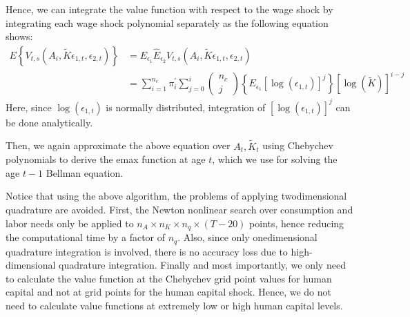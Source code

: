 \documentclass[\econtexRoot/ImaiKeane]{subfiles}
\begin{document}
Hence, we can integrate the value function with respect to the wage shock by integrating each wage shock polynomial separately as the following equation shows:
$$
\begin{aligned}
E\left\{V_{t, s}\left(A_i, \tilde{K} \epsilon_{1, t}, \epsilon_{2, t}\right)\right\} &=E_{\epsilon_1} \hat{E}_{\epsilon_2} V_{t, s}\left(A_i, \tilde{K} \epsilon_{1, t}, \epsilon_{2, t}\right) \\
&=\sum_{i=1}^{n_c} \pi_i^{\prime} \sum_{j=0}^i\left(\begin{array}{c}
n_c \\
j
\end{array}\right)\left\{E_{\epsilon_1}\left[\log \left(\epsilon_{1, t}\right)\right]^j\right\}[\log (\tilde{K})]^{i-j}
\end{aligned}
$$
Here, since $\log \left(\epsilon_{1, t}\right)$ is normally distributed, integration of $\left[\log \left(\epsilon_{1, t}\right)\right]^j$ can be done analytically.\par
\medskip
Then, we again approximate the above equation over $A_t, \tilde{K}_t$ using Chebychev polynomials to derive the emax function at age $t$, which we use for solving the age $t-1$ Bellman equation. \par
Notice that using the above algorithm, the problems of applying twodimensional quadrature are avoided. First, the Newton nonlinear search over consumption and labor needs only be applied to $n_A \times n_K \times n_q \times(T-20)$ points, hence reducing the computational time by a factor of $n_q$. Also, since only onedimensional quadrature integration is involved, there is no accuracy loss due to high-dimensional quadrature integration. Finally and most importantly, we only need to calculate the value function at the Chebychev grid point values for human capital and not at grid points for the human capital shock. Hence, we do not need to calculate value functions at extremely low or high human capital levels.
\end{document}

